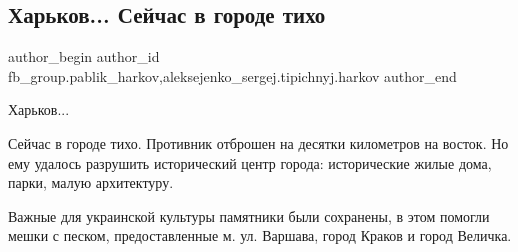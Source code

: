 
 
 
 
 
 
\subsection{Харьков... Сейчас в городе тихо}
\label{sec:14_05_2022.fb.fb_group.pablik_harkov.1.harkov_tiho}
 
\ifcmt
 author_begin
   author_id fb_group.pablik_harkov,aleksejenko_sergej.tipichnyj.harkov
 author_end
\fi

Харьков...

Сейчас в городе тихо. Противник отброшен на десятки километров на восток. Но
ему удалось разрушить исторический центр города: исторические жилые дома,
парки, малую архитектуру.


Важные для украинской культуры памятники были сохранены, в этом помогли мешки с
песком, предоставленные м. ул. Варшава, город Краков и город Величка.

